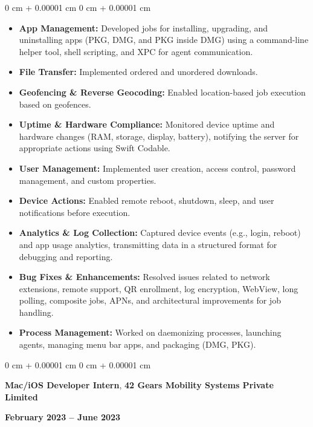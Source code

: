\documentclass[10pt, letterpaper]{article}
\newenvironment{highlights}{
    \begin{itemize}[
        topsep=0.10 cm,
        parsep=0.10 cm,
        partopsep=0pt,
        itemsep=0pt,
        leftmargin=0 cm + 10pt
    ]
}{
    \end{itemize}
} %
\newenvironment{onecolentry}{
    \begin{adjustwidth}{
        0 cm + 0.00001 cm
    }{
        0 cm + 0.00001 cm
    }
}{
    \end{adjustwidth}
} %
\newenvironment{twocolentry}[2][]{
    \onecolentry
    \def\secondColumn{#2}
    \setcolumnwidth{\fill, 4.5 cm}
    \begin{paracol}{2}
}{
    \switchcolumn \raggedleft \secondColumn
    \end{paracol}
    \endonecolentry
} %
\begin{document}
        \vspace{0.10 cm}
        \begin{onecolentry}
            \begin{highlights}
                \item \textbf{App Management:} Developed jobs for installing, upgrading, and uninstalling apps (PKG, DMG, and PKG inside DMG) using a command-line helper tool, shell scripting, and XPC for agent communication.
                \item \textbf{File Transfer:} Implemented ordered and unordered downloads.
                \item \textbf{Geofencing \& Reverse Geocoding:} Enabled location-based job execution based on geofences.
                \item \textbf{Uptime \& Hardware Compliance:} Monitored device uptime and hardware changes (RAM, storage, display, battery), notifying the server for appropriate actions using Swift Codable.
                \item \textbf{User Management:} Implemented user creation, access control, password management, and custom properties.
                \item \textbf{Device Actions:} Enabled remote reboot, shutdown, sleep, and user notifications before execution.
                \item \textbf{Analytics \& Log Collection:} Captured device events (e.g., login, reboot) and app usage analytics, transmitting data in a structured format for debugging and reporting.
                \item \textbf{Bug Fixes \& Enhancements:} Resolved issues related to network extensions, remote support, QR enrollment, log encryption, WebView, long polling, composite jobs, APNs, and architectural improvements for job handling.
                \item \textbf{Process Management:} Worked on daemonizing processes, launching agents, managing menu bar apps, and packaging (DMG, PKG).
            \end{highlights}
        \end{onecolentry}

        \vspace{0.2 cm}

        \begin{twocolentry}{
            \textbf{February 2023 – June 2023}
        }
            \textbf{Mac/iOS Developer Intern}, \textbf{42 Gears Mobility Systems Private Limited}
        \end{twocolentry}
\end{document}
